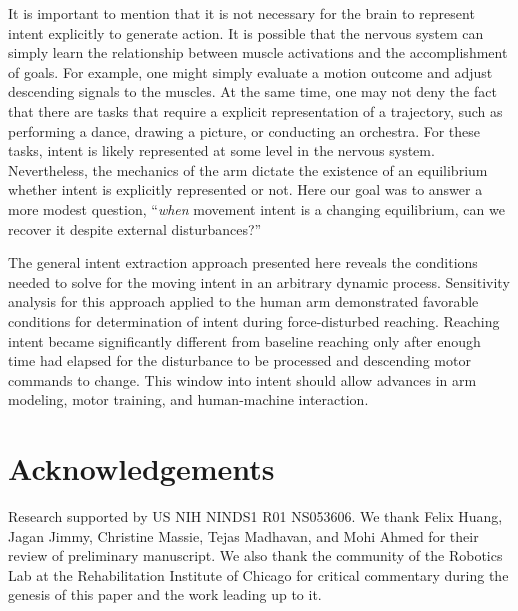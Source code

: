 It is important to mention that it is not necessary for the brain to represent intent explicitly to generate action. It is possible that the nervous system can simply learn the relationship between muscle activations and the accomplishment of goals. For example, one might simply evaluate a motion outcome and adjust descending signals to the muscles. At the same time, one may not deny the fact that there are tasks that require a explicit representation of a trajectory, such as performing a dance, drawing a picture, or conducting an orchestra. For these tasks, intent is likely represented at  some level in the nervous system. Nevertheless, the mechanics of the arm dictate the existence of an equilibrium whether intent is explicitly represented or not. Here our goal was to answer a more modest question, ``\textit{when} movement intent is a changing equilibrium, can we recover it despite external disturbances?''

The general intent extraction approach presented here reveals the conditions needed to solve for the moving intent in an arbitrary dynamic process. Sensitivity analysis for this approach applied to the human arm demonstrated favorable conditions for determination of intent during force-disturbed reaching. Reaching intent became significantly different from baseline reaching only after enough time had elapsed for the disturbance to be processed and descending motor commands to change. This window into intent should allow advances in arm modeling, motor training, and human-machine interaction.

\section*{Acknowledgements}
Research supported by US NIH NINDS1 R01 NS053606.  We thank Felix Huang, Jagan Jimmy, Christine Massie, Tejas Madhavan, and Mohi Ahmed for their review of preliminary manuscript. We also thank the community  of the Robotics Lab at the Rehabilitation Institute of Chicago for critical commentary during the genesis of this paper and the work leading up to it.


%
%
%

